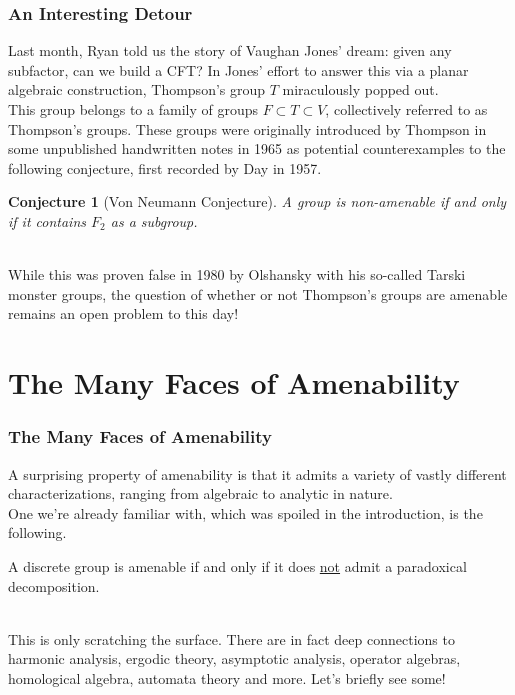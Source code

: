 \documentclass{beamer}
\theoremstyle{example}
\newtheorem{conjecture}{Conjecture}
\begin{document}
\begin{frame}
\frametitle{An Interesting Detour}
Last month, Ryan told us the story of Vaughan Jones' dream: given any subfactor, can we build a CFT? In Jones' effort to answer this via a planar algebraic construction, Thompson's group $T$ miraculously popped out.\\[\baselineskip]

This group belongs to a family of groups $F \subset T \subset V$, collectively referred to as Thompson's groups. These groups were originally introduced by Thompson in some unpublished handwritten notes in 1965 as potential counterexamples to the following conjecture, first recorded by Day in 1957.\\[0.5\baselineskip]

\begin{conjecture}[Von Neumann Conjecture]
A group is non-amenable if and only if it contains $F_2$ as a subgroup.
\end{conjecture}

\noindent\\[0.5\baselineskip] While this was proven false in 1980 by Olshansky with his so-called Tarski monster groups, the question of whether or not Thompson's groups are amenable remains an open problem to this day!
\end{frame}


\section{The Many Faces of Amenability}

\begin{frame}
\frametitle{The Many Faces of Amenability}
\noindent A surprising property of amenability is that it admits a variety of vastly different characterizations, ranging from algebraic to analytic in nature.\\[0.5\baselineskip]

\noindent One we're already familiar with, which was spoiled in the introduction, is the following.\\[0.5\baselineskip]

\begin{theorem}
A discrete group is amenable if and only if it does \underline{not} admit a paradoxical decomposition.
\end{theorem}

\noindent\\[0.5\baselineskip] This is only scratching the surface. There are in fact deep connections to harmonic analysis, ergodic theory, asymptotic analysis, operator algebras, homological algebra, automata theory and more. Let's briefly see some!
\end{frame}
\end{document}
